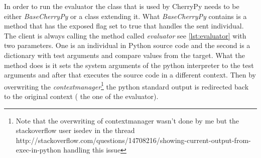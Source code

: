 In order to run the evaluator the class that is used by CherryPy needs to be either \textit{BaseCherryPy} or a class extending it. What \textit{BaseCherryPy} contains
is a method that has the exposed flag set to true that handles the sent individual. The client is always calling the method called \textit{evaluator} see \ref{lst:evaluator} with two parameters.
One is an individual in Python source code and the second is a dictionary with test arguments and compare values from the target. What the method does is it sets the system arguments
of the python interpreter to the test arguments and after that executes the source code in a different context. Then by overwriting the \textit{contextmanager}\footnote{Note that the overwriting of contextmanager
wasn't done by me but the stackoverflow user isedev in the thread http://stackoverflow.com/questions/14708216/showing-current-output-from-exec-in-python handling this issue} the python standard output is
redirected back to the original context ( the one of the evaluator).
